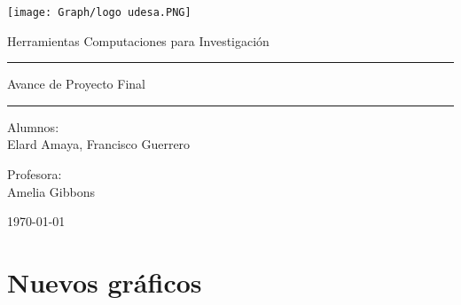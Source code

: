 \documentclass[11pt,a4paper]{article}
\begin{document}
\thispagestyle{empty}
\begin{center}
\texttt{[image: Graph/logo udesa.PNG]}
\end{center}


	\begin{center}
	\LARGE
	Herramientas Computaciones para Investigación
\\			\vspace{1cm}
\hrule
	\vspace{0.5cm}
	\LARGE
 Avance de Proyecto Final
\\		
		\vspace{0.5cm}
		\hrule
				\vspace{1cm}
	\large

	\vspace{2.5cm}
	\large
		Alumnos:\\
	\large
	Elard Amaya, Francisco Guerrero
	
	
	\vspace{1.3cm}
	\normalsize	
	Profesora:\\

	\normalsize
	Amelia Gibbons
	
	\vspace{1.3cm}
	\today
	\end{center}

	
\clearpage
\section*{Nuevos gráficos}
\end{document}
